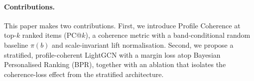 \paragraph{Contributions.} This paper makes two contributions. First, we introduce Profile Coherence at top-$k$ ranked items (PC@$k$), a coherence metric with a band-conditional random baseline $\pi(b)$ and scale-invariant lift normalisation. Second, we propose a stratified, profile-coherent LightGCN with a margin loss atop Bayesian Personalised Ranking (BPR), together with an ablation that isolates the coherence-loss effect from the stratified architecture.

